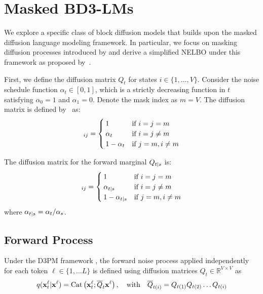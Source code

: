 \documentclass{article} %
\def\algos{BD3-LMs}
\begin{document}
\section{Masked \algos{}}

We explore a specific class of block diffusion models that builds upon the masked diffusion language modeling framework. In particular, we focus on masking diffusion processes introduced by \citet{austin2021structured} and derive a simplified NELBO under this framework as proposed by~\citet{sahoo2024simple, shi2024simplified, ou2025your}.

First, we define the diffusion matrix $Q_t$ for states $i \in \{1, \dots, V\}$. Consider the noise schedule function $\alpha_t \in [0, 1]$, which is a strictly decreasing function in $t$ satisfying $\alpha_{0} = 1$ and $\alpha_{1} = 0$. Denote the mask index as $m=V$. The diffusion matrix is defined by~\citet{austin2021structured} as:
\begin{align}
    [Q_t]_{ij} =
    \begin{cases}
    1 & \text{if } i = j = m \\
    \at & \text{if } i = j \neq m \\
    1-\at & \text{if } j = m, i \neq m
    \end{cases}
\end{align}

The diffusion matrix for the forward marginal $Q_{t|s}$ is:
\begin{align}
    [Q_{t|s}]_{ij} =
    \begin{cases}
    1 & \text{if } i = j = m \\
    \ats & \text{if } i = j \neq m \\
    1-\ats & \text{if } j = m, i \neq m
    \end{cases}
\end{align}
\noindent where $\alpha_{t|s} = \alpha_{t} / \alpha_{s}$.


\subsection{Forward Process}

Under the D3PM framework \citep{austin2021structured}, the forward noise process applied independently for each token $\ell \in \{1, \dots L\}$ is defined using diffusion matrices $Q_t \in \mathbb{R}^{V \times V}$ as
\begin{align}
q({\mathbf x}^\ell_t | {\mathbf x}^\ell) = \text{Cat} \left( {\mathbf x}^\ell_t; \overline{Q}_t {\mathbf x}^\ell \right), \quad \text{with} \quad \overline{Q}_{t(i)} = Q_{t(1)} Q_{t(2)} \dots Q_{t(i)}
\end{align}
\end{document}
